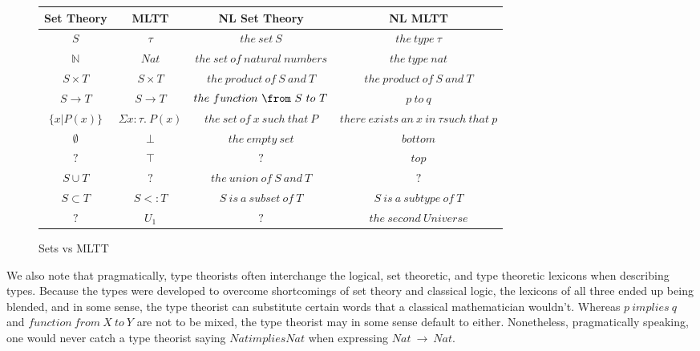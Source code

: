 \begin{figure}[H]
\centering
\begin{tabular}{|c|c|c|c|} \hline
 Set Theory & MLTT & NL Set Theory & NL MLTT \\ \hline
 $S$          & $\tau$                 & $the\ set\ S$                     & $the\ type\ \tau$ \\ 
 $\mathbb{N}$ & $Nat$                  & $the\ set\ of\ natural\ numbers$  & $the\ type\ nat$ \\
 $S \times T$ & $S \times T$           & $the\ product\ of\ S\ and\ T$     & $the\  product\  of\  S\  and\  T$ \\
 $S \to T$    & $S \to T$              & $the\ function\ \from\ S\ to\ T$  & $p\  to\  q$ \\
 $\{x|P(x)\}$ & $\Sigma x : \tau.\ P(x)$ & $the\ set\ of\ x\ such\ that\ P$  & $there\ exists\ an\ x\ in\ \tau such\ that\ p$ \\
  $\emptyset$  & $\bot$                 & $the\ empty\ set$                 & $bottom$ \\
 $?$          & $\top$                 & $?$                             & $top$ \\
 $S \cup T$   & $?$                    & $the\ union\ of\ S\ and\ T$       & $?$ \\
 $S \subset T$ & $S <: T$              & $S\ is\ a\ subset\ of\ T$          & $S\ is\ a\ subtype\ of\ T$ \\
 $?$          & $U_1$                  & $?$ & $the\ second\ Universe$        \\ \hline 
\end{tabular}
\caption{Sets vs MLTT} \label{fig:P2}
\end{figure}


We also note that pragmatically, type theorists often interchange the logical,
set theoretic, and type theoretic lexicons when describing types. Because the
types were developed to overcome shortcomings of set theory and classical logic,
the lexicons of all three ended up being blended, and in some sense, the type
theorist can substitute certain words that a classical mathematician
wouldn't.  Whereas $p\ implies\ q$ and $function\ from\ X\ to\ Y$ are not to
be mixed, the type theorist may in some sense default to either.
Nonetheless, pragmatically speaking, one would never catch a type theorist
saying $Nat implies Nat$ when expressing $Nat\ \to\ Nat$.


